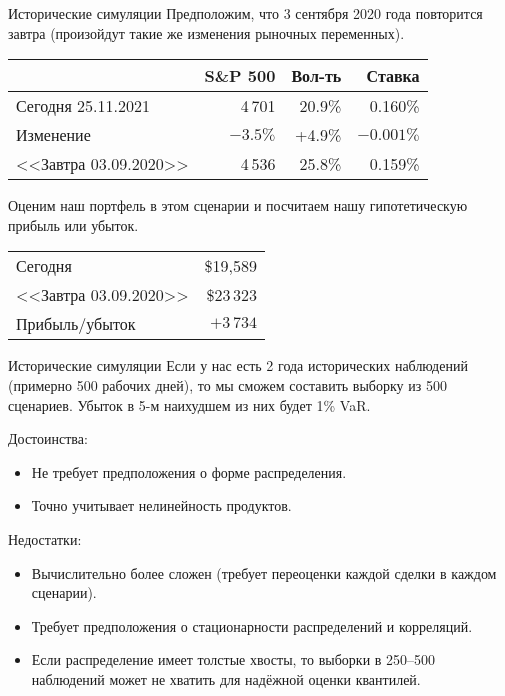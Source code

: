 \documentclass{beamer}
\begin{document}
\begin{frame}{Исторические симуляции}
\justify
Предположим, что 3 сентября 2020 года повторится завтра (произойдут такие же изменения рыночных переменных).

\justify
\centering
\begin{tabular}{l|r|r|r}
                      & S\&P 500 & Вол-ть   & Ставка \\ \hline
Сегодня 25.11.2021    & 4\,701   & 20.9\%   & 0.160\% \\
Изменение             & $-3.5\%$ & +4.9\%   & $-0.001\%$ \\ \hline
<<Завтра 03.09.2020>> & 4\,536   & 25.8\%   & 0.159\%
\end{tabular}

\justify
Оценим наш портфель в этом сценарии и посчитаем нашу гипотетическую прибыль или убыток.

\justify
\centering
\begin{tabular}{l|r}
Сегодня               & \$19,589 \\
<<Завтра 03.09.2020>> & \$23\,323 \\ \hline
Прибыль/убыток        & $+3\,734$
\end{tabular}
\end{frame}



\begin{frame}{Исторические симуляции}
\justify
Если у нас есть 2 года исторических наблюдений (примерно 500 рабочих дней), то мы сможем составить выборку из 500 сценариев. Убыток в 5-м наихудшем из них будет 1\% VaR.

\justify
Достоинства:
\begin{itemize}
\justifying
\item Не требует предположения о форме распределения.
\item Точно учитывает нелинейность продуктов.
\end{itemize}

\justify
Недостатки:
\begin{itemize}
\justifying
\item Вычислительно более сложен (требует переоценки каждой сделки в каждом сценарии).
\item Требует предположения о стационарности распределений и корреляций.
\item Если распределение имеет толстые хвосты, то выборки в 250--500 наблюдений может не хватить для надёжной оценки квантилей.
\end{itemize}
\end{frame}
\end{document}
